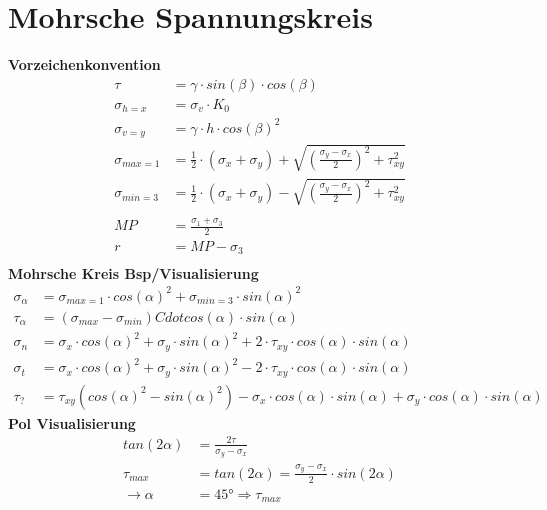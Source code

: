 \section{Mohrsche Spannungskreis}
	\begin{minipage}{\linewidth}
		\textbf{Vorzeichenkonvention} \\
	\begin{align*}
		\tau	 		&= \gamma \cdot sin(\beta) \cdot cos(\beta) \\
		\sigma_{h=x} 	&= \sigma_v \cdot K_0 \\
		\sigma_{v=y} 	&= \gamma \cdot h \cdot cos(\beta)^2 \\ 
		\sigma_{max=1}	&=\frac{1}{2} \cdot (\sigma_x + \sigma_y) + \sqrt{\left(\frac{\sigma_y - \sigma_x}{2}\right)^2 + \tau_{xy}^2} \\
		\sigma_{min=3}	&=\frac{1}{2} \cdot (\sigma_x + \sigma_y) - \sqrt{\left(\frac{\sigma_y - \sigma_x}{2}\right)^2 + \tau_{xy}^2} \\
	 \\
		MP				&= \frac{\sigma_1 + \sigma_3}{2} \\
		r				&= MP - \sigma_3 \\
	\end{align*}
		\textbf{Mohrsche Kreis Bsp/Visualisierung} \\
	\begin{align*}
		\sigma_\alpha	&=\sigma_{max=1} \cdot cos(\alpha)^2 + \sigma_{min=3} \cdot sin(\alpha)^2 \\
		\tau_\alpha		&= (\sigma_{max} -\sigma_{min}) Cdot cos(\alpha) \cdot sin(\alpha) \\
		\sigma_n		&= \sigma_x \cdot cos(\alpha)^2 + \sigma_y \cdot sin(\alpha)^2 + 2 \cdot \tau_{xy} \cdot cos(\alpha) \cdot sin(\alpha) \\
		\sigma_t		&= \sigma_x \cdot cos(\alpha)^2 + \sigma_y \cdot sin(\alpha)^2 - 2 \cdot \tau_{xy} \cdot cos(\alpha) \cdot sin(\alpha) \\
		\tau_?			&= \tau_{xy} (cos(\alpha)^2 - sin(\alpha)^2) - \sigma_x \cdot cos(\alpha) \cdot sin(\alpha) + \sigma_y \cdot cos(\alpha) \cdot sin(\alpha)
	\end{align*}
		\textbf{Pol Visualisierung}
	\begin{align*}
		tan(2 \alpha)	&= \frac{2 \tau}{\sigma_y - \sigma_x} \\
		\tau_{max}		&= tan(2 \alpha) = \frac{\sigma_y - \sigma_x}{2} \cdot sin(2 \alpha) \\
		\rightarrow \alpha &= 45° \Rightarrow \tau_{max} \\ 
	\end{align*}
	
	\end{minipage}